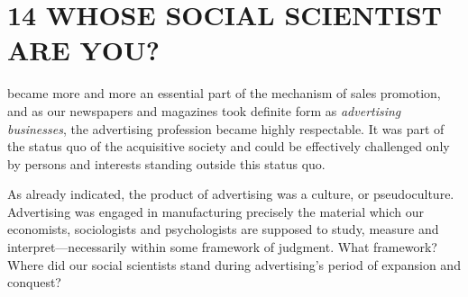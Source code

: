 \documentclass[nohyper,openany,nobib]{tufte-book}
\let\oldchapter\chapter
\def\chapter{%
  \setcounter{footnote}{0}%
  \oldchapter
}
\begin{document}
\chapter[14 \hspace*{1mm} WHOSE SOCIAL SCIENTIST ARE YOU?]{14 WHOSE SOCIAL SCIENTIST ARE YOU?}

 became more and more an essential part of the mechanism
of sales promotion, and as our newspapers and magazines took definite
form as \emph{advertising businesses}, the advertising profession became
highly respectable. It was part of the status quo of the acquisitive
society and could be effectively challenged only by persons and
interests standing outside this status quo.

As already indicated, the product of advertising was a culture, or
pseudoculture. Advertising was engaged in manufacturing precisely the
material which our economists, sociologists and psychologists are
supposed to study, measure and interpret---necessarily within some
framework of judgment. What framework? Where did our social scientists
stand during advertising's period of expansion and conquest?
\end{document}
